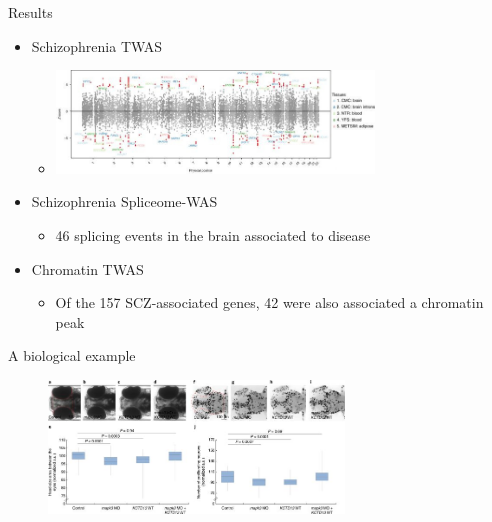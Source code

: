 \documentclass[aspectratio=169,12pt]{beamer}
\begin{document}
\begin{frame}{Results}

	\begin{itemize}
		\item Schizophrenia TWAS
		\begin{itemize}
			\item \includegraphics[width=0.7\textwidth]{gusev2018/2-schizophrenia_TWAS}
		\end{itemize}

		\item Schizophrenia Spliceome-WAS
		\begin{itemize}
			\item 46 splicing events in the brain associated to disease
		\end{itemize}

		\item Chromatin TWAS
		\begin{itemize}
			\item Of the 157 SCZ-associated genes, 42 were also 
associated a chromatin peak
		\end{itemize}
	\end{itemize}

\end{frame}

\begin{frame}{A biological example}

	\begin{figure}
		\includegraphics[width=0.7\textwidth]{gusev2018/6-zebrafish}
	\end{figure}


\end{frame}
\end{document}

